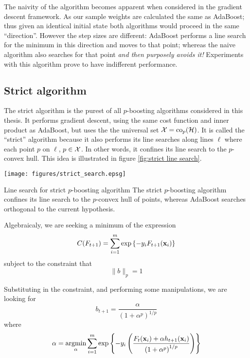 The naivity of the algorithm becomes apparent when considered in
the gradient descent framework.  As our sample weights are calculated
the same as AdaBoost; thus given an identical initial state both
algorithms would proceed in the same ``direction''.  However the step
sizes are different: AdaBoost performs a line search for the minimum
in this direction and moves to that point; whereas the naive algorithm
also searches for that point \emph{and then purposely avoids it!}
Experiments with this algorithm prove to have indifferent performance.

\subsection{Strict algorithm}

The strict algorithm is the purest of all $p$-boosting algorithms
considered in this thesis.  It performs gradient descent, using the
same cost function and inner product as AdaBoost, but uses the the
universal set $\mathcal{X} = \mathrm{co}_p(\mathcal{H})$.  It is called the ``strict''
algorithm because it also performs its line searches along lines
$\ell$ where each point $p$ on $\ell$, $p \in \mathcal{X}$.  In other words,
it confines its line search to the $p$-convex hull.  This idea is
illustrated in figure \ref{fig:strict line search}.

\begin{linefigure}
\begin{center}
\texttt{[image: figures/strict\_search.epsg]}
\end{center}
\begin{capt}{Line search for strict $p$-boosting algorithm}
The strict $p$-boosting algorithm confines its line search to the
$p$-convex hull of points, whereas AdaBoost searches orthogonal to the
current hypothesis.
\end{capt}
\label{fig:strict line search}
\end{linefigure}

Algebraicaly, we are seeking a minimum of the expression
%
\begin{equation}
C(F_{t+1}) = \sum_{i=1}^{m} \exp \left\{ -y_i F_{t+1}(\mathbf{x}_i) \right\}
\end{equation}
%
subject to the constraint that
%
\begin{equation}
\| b \|_{p} = 1
\end{equation}

Substituting in the constraint, and performing some manipulations, we
are looking for
%
\begin{equation}
b_{t+1} = \frac{\alpha}{\left( 1 + \alpha^p \right) ^ {1/p}}
\end{equation}
%
where
%
\begin{equation}
\alpha = \argmin_{\alpha} \sum_{i=1}^{m} \exp \left\{ -y_i \left(
\frac{F_{t}(\bfx_i) + \alpha h_{t+1}(\bfx_i)}{\left( 1 + \alpha ^p
\right) ^{1/p}} \right) \right\}
\label{eqn:strict minimise function}
\end{equation}

